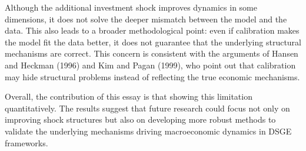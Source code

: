 \documentclass[12pt]{article}
\begin{document}
Although the additional investment shock improves dynamics in some dimensions, it does not solve the deeper mismatch between the model and the data.
This also leads to a broader methodological point: even if calibration makes the model fit the data better, it does not guarantee that the underlying structural mechanisms are correct.
This concern is consistent with the arguments of Hansen and Heckman (1996) and Kim and Pagan (1999), who point out that calibration may hide structural problems instead of reflecting the true economic
mechanisms.


Overall, the contribution of this essay is that showing this limitation quantitatively. The results suggest that future research could focus not only on improving shock structures but also on developing more robust methods to validate the underlying mechanisms driving macroeconomic dynamics in DSGE frameworks.
\end{document}
